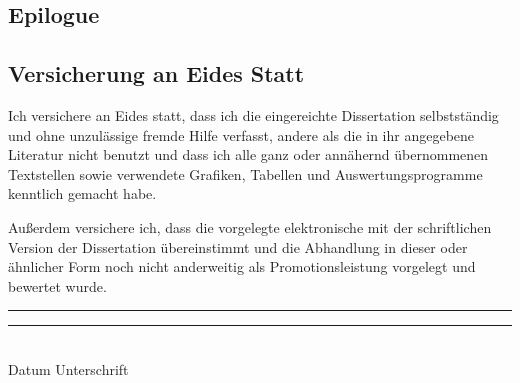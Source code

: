 \documentclass{dissertation}
\begin{document}
% 
% 
% 

\begin{fullwidth}
\part{Epilogue}
\end{fullwidth}

% 

\begin{fullwidth}
\printbibliography{}
\end{fullwidth}

\cleardoublepage{}

\chapter*{Versicherung an Eides Statt}

Ich versichere an Eides statt, dass ich die eingereichte Dissertation selbstständig und ohne unzulässige fremde Hilfe verfasst, andere als die in ihr angegebene Literatur nicht benutzt und dass ich alle ganz oder annähernd übernommenen Textstellen sowie verwendete Grafiken, Tabellen und Auswertungsprogramme kenntlich gemacht habe.

Außerdem versichere ich, dass die vorgelegte elektronische mit der schriftlichen Version der Dissertation übereinstimmt und die Abhandlung in dieser oder ähnlicher Form noch nicht anderweitig als Promotionsleistung vorgelegt und bewertet wurde.

\vspace{1cm}
\noindent
\rule{45mm}{0.1pt} \hfill{} \rule{45mm}{0.1pt}\\
Datum \hfill{} Unterschrift

\cleardoublepage{}
\end{document}
